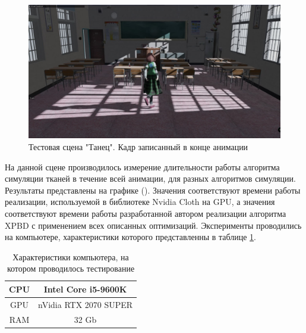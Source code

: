 	\begin{figure}[ht!] 
		\center
		\includegraphics [scale=0.35] {my_folder/images//dance3}	
		\caption{Тестовая сцена "Танец". Кадр записанный в конце анимации} 
		\label{fig:dance3}
	\end{figure}
	
	\FloatBarrier
	
	На данной сцене производилось измерение длительности работы алгоритма симуляции тканей в течение всей анимации, для разных алгоритмов симуляции. Результаты представлены на графике (). Значения  соответствуют времени работы реализации, используемой в библиотеке Nvidia Cloth на GPU, а значения  соответствуют времени работы разработанной автором реализации алгоритма XPBD с применением всех описанных оптимизаций. Эксперименты проводились на компьютере, характеристики которого представленны в таблице \ref{tab:spec}.
	
	\begin{table}[ht]
		\caption{Характеристики компьютера, на котором проводилось тестирование}
		\label{tab:spec}
		\centering
		\begin{SingleSpace}
			\begin{tabular}{|c|c|}
				\hline
				CPU & Intel Core 
				i5-9600K
				\\
				\hline
				GPU & nVidia RTX 2070 SUPER \\
				\hline
				RAM & 32 Gb \\
				\hline
		\end{tabular}
		\end{SingleSpace}
	\end{table}
	
